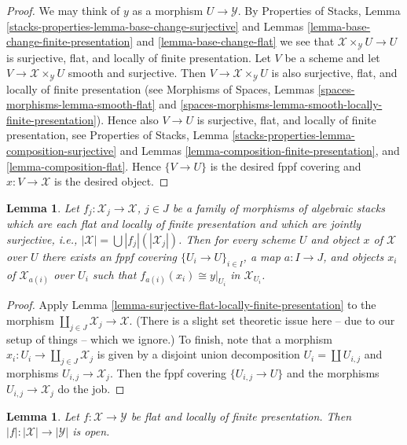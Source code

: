 \documentclass{stacks-project}
\theoremstyle{plain}
\newtheorem{lemma}[subsection]{Lemma}
\theoremstyle{definition}
\theoremstyle{remark}
\numberwithin{equation}{subsection}
\begin{document}
\begin{proof}
We may think of $y$ as a morphism $U \to \mathcal{Y}$. By
Properties of Stacks, Lemma
\ref{stacks-properties-lemma-base-change-surjective}
and
Lemmas \ref{lemma-base-change-finite-presentation} and
\ref{lemma-base-change-flat}
we see that $\mathcal{X} \times_\mathcal{Y} U \to U$ is surjective, flat,
and locally of finite presentation. Let $V$ be a scheme and let
$V \to \mathcal{X} \times_\mathcal{Y} U$ smooth and surjective.
Then $V \to \mathcal{X} \times_\mathcal{Y} U$ is also surjective, flat, and
locally of finite presentation (see
Morphisms of Spaces, Lemmas
\ref{spaces-morphisms-lemma-smooth-flat} and
\ref{spaces-morphisms-lemma-smooth-locally-finite-presentation}).
Hence also $V \to U$ is surjective, flat, and
locally of finite presentation, see
Properties of Stacks, Lemma
\ref{stacks-properties-lemma-composition-surjective}
and
Lemmas \ref{lemma-composition-finite-presentation}, and
\ref{lemma-composition-flat}.
Hence $\{V \to U\}$ is the desired fppf covering and $x : V \to \mathcal{X}$
is the desired object.
\end{proof}

\begin{lemma}
\label{lemma-surjective-family-flat-locally-finite-presentation}
Let $f_j : \mathcal{X}_j \to \mathcal{X}$, $j \in J$ be a family of morphisms
of algebraic stacks which are each flat and locally of finite presentation
and which are jointly surjective, i.e.,
$|\mathcal{X}| = \bigcup |f_j|(|\mathcal{X}_j|)$.
Then for every scheme $U$ and object $x$ of $\mathcal{X}$ over $U$
there exists an fppf covering $\{U_i \to U\}_{i \in I}$, a map
$a : I \to J$, and objects $x_i$ of $\mathcal{X}_{a(i)}$ over $U_i$
such that $f_{a(i)}(x_i) \cong y|_{U_i}$ in $\mathcal{X}_{U_i}$.
\end{lemma}

\begin{proof}
Apply
Lemma \ref{lemma-surjective-flat-locally-finite-presentation}
to the morphism $\coprod_{j \in J} \mathcal{X}_j \to \mathcal{X}$.
(There is a slight set theoretic issue here -- due to our setup of
things -- which we ignore.) To finish, note that a morphism
$x_i : U_i \to \coprod_{j \in J} \mathcal{X}_j$ is given by a
disjoint union decomposition $U_i = \coprod U_{i, j}$ and morphisms
$U_{i, j} \to \mathcal{X}_j$. Then the fppf covering $\{U_{i, j} \to U\}$
and the morphisms $U_{i, j} \to \mathcal{X}_j$ do the job.
\end{proof}

\begin{lemma}
\label{lemma-fppf-open}
Let $f : \mathcal{X} \to \mathcal{Y}$ be flat and locally of finite
presentation. Then $|f| : |\mathcal{X}| \to |\mathcal{Y}|$ is open.
\end{lemma}
\end{document}
